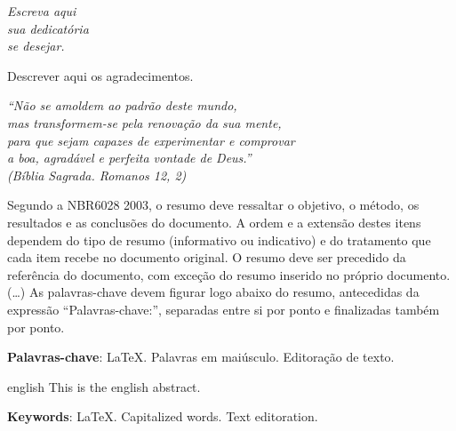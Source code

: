 \documentclass[
    12pt,				%
    a4paper,            %
    oneside,			%
    openright,			%
    ruledheader,
    anapcustomindent,
    sumario = tradicional,
    abntfigtabnum,
    tocpage=plain,
    english,			%
	brazil,				%
    ]{abntex-ifsuldeminas/abntex2-orientadora} %
\begin{document}
\begin{dedicatoria}
   \vspace*{\fill}
   \centering
   \noindent
   \textit{ Escreva aqui \\ sua dedicatória \\ se desejar. } \vspace*{\fill}
\end{dedicatoria}

\begin{agradecimentos}

Descrever aqui os agradecimentos.


\end{agradecimentos}

\begin{epigrafe}
    \vspace*{\fill}
	\begin{flushright}
		\textit{``Não se amoldem ao padrão deste mundo, \\
		mas transformem-se pela renovação da sua mente, \\
		para que sejam capazes de experimentar e comprovar \\
		a boa, agradável e perfeita vontade de Deus.''\\
		(Bíblia Sagrada. Romanos 12, 2)}
	\end{flushright}
\end{epigrafe}


\setlength{\absparsep}{18pt} %
\begin{resumo}
 Segundo a NBR6028 2003, o resumo deve ressaltar o
 objetivo, o método, os resultados e as conclusões do documento. A ordem e a extensão
 destes itens dependem do tipo de resumo (informativo ou indicativo) e do
 tratamento que cada item recebe no documento original. O resumo deve ser
 precedido da referência do documento, com exceção do resumo inserido no
 próprio documento. (\ldots) As palavras-chave devem figurar logo abaixo do
 resumo, antecedidas da expressão ``Palavras-chave:'', separadas entre si por
 ponto e finalizadas também por ponto.

 \textbf{Palavras-chave}: \LaTeX. Palavras em maiúsculo. Editoração de texto.
\end{resumo}

\begin{resumo}[ABSTRACT]
 \begin{otherlanguage*}{english}
   This is the english abstract.

   \vspace{\onelineskip}
 
   \noindent 
   \textbf{Keywords}: \LaTeX. Capitalized words. Text editoration.
 \end{otherlanguage*}
\end{resumo}
\end{document}
